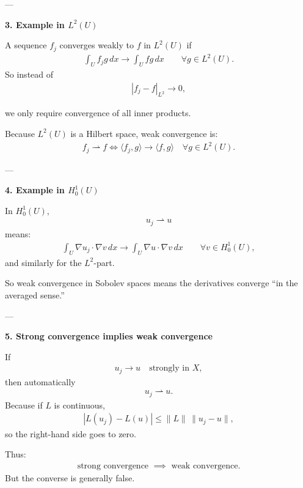 \documentclass[12pt,a4paper]{report}
\begin{document}
\begin{description}
\begin{description}
---

\item \textbf{3. Example in $L^2(U)$}

A sequence $f_j$ converges weakly to $f$ in $L^2(U)$ if
\begin{align*}
\int_U f_j g\,dx \to \int_U fg\,dx
\qquad\forall g\in L^2(U).
\end{align*}
So instead of
\begin{align*}
|f_j-f|_{L^2}\to 0,
\end{align*}

we only require convergence of all inner products.

Because $L^2(U)$ is a Hilbert space, weak convergence is:
\begin{align*}
f_j\rightharpoonup f \iff \langle f_j,g\rangle\to\langle f,g\rangle \quad\forall g\in L^2(U).
\end{align*}

---

\item \textbf{4. Example in $H_0^1(U)$}

In $H_0^1(U)$,
\begin{align*}
u_j\rightharpoonup u
\end{align*}
means:
\begin{align*}
\int_U \nabla u_j\cdot\nabla v\,dx \to \int_U \nabla u\cdot\nabla v\,dx \qquad \forall v\in H_0^1(U),
\end{align*}
and similarly for the $L^2$-part.

So weak convergence in Sobolev spaces means the derivatives converge “in the averaged sense.”

---

\item \textbf{5. Strong convergence implies weak convergence}

If
\begin{align*}
u_j\to u
\quad\text{strongly in }X,
\end{align*}
then automatically
\begin{align*}
u_j\rightharpoonup u.
\end{align*}
Because if $L$ is continuous,
\begin{align*}
|L(u_j)-L(u)| \le \|L\|\,\|u_j-u\|,
\end{align*}
so the right-hand side goes to zero.

Thus:
\begin{align*}
\text{strong convergence } \implies \text{ weak convergence}.
\end{align*}
But the converse is generally false.


\end{description}
\end{description}
\end{document}
